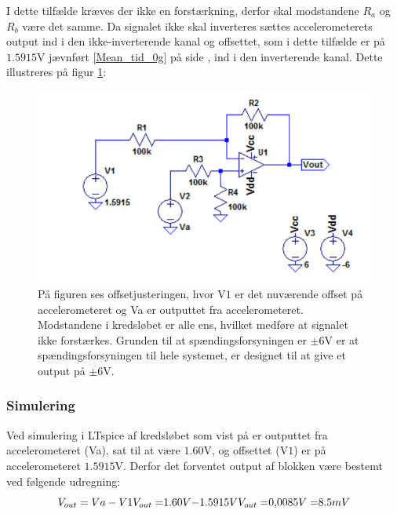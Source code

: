 I dette tilfælde kræves der ikke en forstærkning, derfor skal modstandene $R_{a}$ og $R_{b}$ være det samme. Da signalet ikke skal inverteres sættes accelerometerets output ind i den ikke-inverterende kanal og offsettet, som i dette tilfælde er på $1.5915$V jævnført  \ref{Mean_tid_0g} på side \pageref{Mean_tid_0g}, ind i den inverterende kanal. Dette illustreres på figur \ref{fig:Offset_generisk}:
\begin{figure}[H]
\centering
\includegraphics[scale=1]{figures/cProblemloesning/Offset_generisk.png}
\caption{På figuren ses offsetjusteringen, hvor V$1$ er det nuværende offset på accelerometeret og Va er outputtet fra accelerometeret. Modstandene i kredsløbet er alle ens, hvilket medføre at signalet ikke forstærkes. Grunden til at spændingsforsyningen er $\pm 6$V er at spændingsforsyningen til hele systemet, er designet til at give et output på $\pm 6$V.}
\label{fig:Offset_generisk}
\end{figure}

\subsubsection{Simulering}
Ved simulering i LTspice af kredsløbet som vist på  er outputtet fra accelerometeret (Va), sat til at være $1.60$V, og offsettet (V$1$) er på accelerometeret $1.5915$V. Derfor det forventet output af blokken være bestemt ved følgende udregning: 
\begin{equation}
V_{out} = Va - V$1$ \\
V_{out} = $1.60$V - $1.5915$V \\
V_{out} = $0,0085$V = $8.5$mV
\end{equation}  

